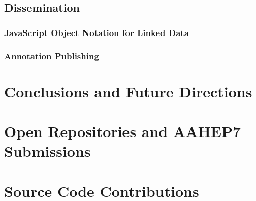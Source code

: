 \documentclass[12pt,a4paper]{report}
\begin{document}
    \clearpage

    \subsection{Dissemination}
      \label{sec:diss}
      

      \subsubsection{JavaScript Object Notation for Linked Data}
        \label{sec:json}
        

      \clearpage

      \subsubsection{Annotation Publishing}
        \label{sec:pub}
        

  \cleardoublepage

  \section{Conclusions and Future Directions}
    \label{sec:outro}
    

  \cleardoublepage

  
  

  \cleardoublepage

  \appendixpage
  \addappheadtotoc

  \cleardoublepage

  \appendix
    \section{Open Repositories and AAHEP7 Submissions}
      \label{apx:or2014}
      

    \cleardoublepage

    \section{Source Code Contributions}
      \label{apx:code}
      

  
  
\end{document}
